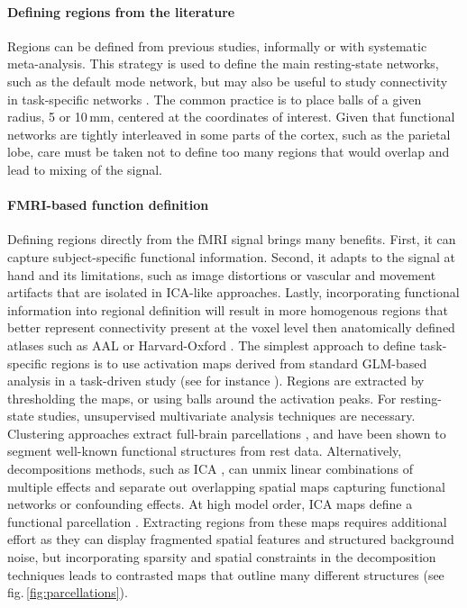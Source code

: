 \documentclass[5p]{elsarticle}
\begin{document}
\paragraph{Defining regions from the literature}
%
Regions can be defined from previous studies, informally or with
systematic meta-analysis. This strategy is used to define the main
resting-state networks, such as the default mode network, but may also be
useful to study connectivity in task-specific networks
\cite{biswal1995,rissman2004,dosenbach2006,grillon2012}. The common practice is to place balls of a given
radius, 5 or 10\,mm, centered at the coordinates of interest. Given that
functional networks are tightly interleaved in some parts of the cortex,
such as the parietal lobe, care must be taken not to define too many
regions that would overlap and lead to mixing of the signal.

\paragraph{FMRI-based function definition}
%
Defining regions directly from the fMRI signal brings many benefits.
First, it can capture subject-specific functional information. Second, it
adapts to the signal at hand and its limitations, such as
image distortions or vascular and movement artifacts that are isolated
in ICA-like approaches. Lastly, incorporating functional information into
regional definition will result in more homogenous regions that better represent
connectivity present at the voxel level then anatomically defined atlases such
as AAL or Harvard-Oxford \cite{craddock2011}. The simplest approach to define task-specific
regions is to use activation maps derived from standard GLM-based
analysis in a task-driven study (see for instance \cite{poldrack2011}).
Regions are extracted by thresholding the maps, or using balls around the
activation peaks. For resting-state studies, unsupervised multivariate
analysis techniques are necessary. Clustering approaches extract
full-brain parcellations \cite{craddock2011, bellec2010, yeo2011,
thirion2006}, and have been shown to segment well-known functional
structures from rest data. Alternatively, decompositions
methods, such as ICA \cite{beckmann2004}, can unmix linear
combinations of multiple effects and separate out overlapping spatial maps
capturing functional networks or confounding effects. At high model
order, ICA maps define a functional parcellation \cite{kiviniemi2009}.
Extracting regions from these maps requires additional effort as they can
display fragmented spatial features and structured background noise, but
incorporating sparsity and spatial constraints in the decomposition
techniques leads to contrasted maps that outline many different
structures \cite{craddock2011, varoquaux2012} (see fig.\,\ref{fig:parcellations}).
\end{document}
